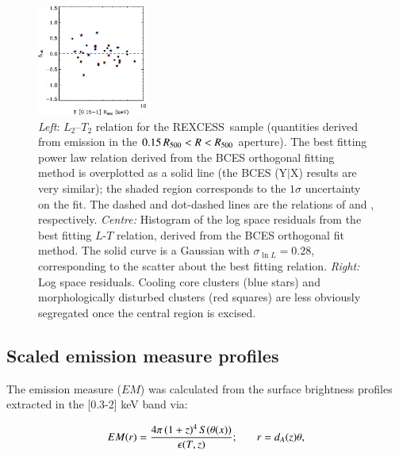 \documentclass[oldversion]{aa}
\newcommand{\rexcess}{{\gwpfont REXCESS}}
\begin{document}
{\begin{figure}[]
\includegraphics[width=0.32\textwidth]{0944f3b.eps}
\caption{{\footnotesize {\it Left}: $L_2$--$T_2$ relation for the
    \rexcess\ sample (quantities derived from emission in the 
    $0.15\,R_{500} < R < R_{500}$ aperture). The best fitting power law relation
    derived from the BCES orthogonal fitting method is 
    overplotted as a solid line (the BCES (Y$|$X) results are very similar); the shaded region corresponds to the $1\sigma$ uncertainty on the fit. The dashed and dot-dashed lines are the relations of \citet{ae99} and \citet{mark98}, respectively. {\em Centre:} Histogram of the log
    space residuals from the best 
    fitting $L$-$T$ relation, derived from the BCES orthogonal fit
    method. The solid curve is a Gaussian with $\sigma_{\ln{L}} =
    0.28$, corresponding to the scatter about the best fitting
    relation. {\em Right:} Log space residuals. Cooling core clusters
    (blue stars) and morphologically disturbed clusters (red squares)
    are less obviously segregated once the central region is
    excised. }}\label{fig:LxTcorr}   
   \end{figure}



\subsection{Scaled emission measure profiles}

The emission measure ($EM$) was calculated from the surface
brightness profiles extracted in the [0.3-2] keV band via:  

\begin{equation}
EM(r) = \frac{4 \pi\, (1 + z)^4\,  S(\theta(x))}{\epsilon(T,z)} \\;\ \ \ \ \ \ \ r =  d_A(z) \theta,
\end{equation}

}
\end{document}
